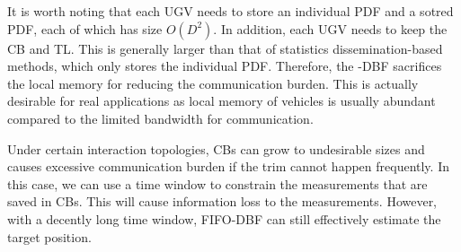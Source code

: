 	
	It is worth noting that each UGV needs to store an individual PDF and a sotred PDF, each of which has size $O(D^2)$. 
	In addition, each UGV needs to keep the CB and TL.
	This is generally larger than that of statistics dissemination-based methods, which only stores the individual PDF.
	Therefore, the \proto-DBF sacrifices the local memory for reducing the communication burden. 
	This is actually desirable for real applications as local memory of vehicles is usually abundant compared to the limited bandwidth for communication.
	
	
	\begin{rem}
		Under certain interaction topologies, CBs can grow to undesirable sizes and causes excessive communication burden if the trim cannot happen frequently.
		In this case, we can use a time window to constrain the measurements that are saved in CBs.
		This will cause information loss to the measurements.
		However, with a decently long time window, FIFO-DBF can still effectively estimate the target position.
	\end{rem}